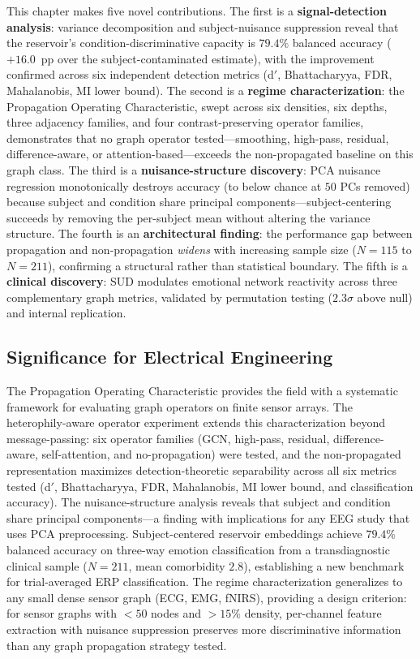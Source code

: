 This chapter makes five novel contributions. The first is a \textbf{signal-detection analysis}: variance decomposition and subject-nuisance suppression reveal that the reservoir's condition-discriminative capacity is $79.4\%$ balanced accuracy ($+16.0$~pp over the subject-contaminated estimate), with the improvement confirmed across six independent detection metrics (d$'$, Bhattacharyya, FDR, Mahalanobis, MI lower bound). The second is a \textbf{regime characterization}: the Propagation Operating Characteristic, swept across six densities, six depths, three adjacency families, and four contrast-preserving operator families, demonstrates that no graph operator tested---smoothing, high-pass, residual, difference-aware, or attention-based---exceeds the non-propagated baseline on this graph class. The third is a \textbf{nuisance-structure discovery}: PCA nuisance regression monotonically destroys accuracy (to below chance at $50$ PCs removed) because subject and condition share principal components---subject-centering succeeds by removing the per-subject mean without altering the variance structure. The fourth is an \textbf{architectural finding}: the performance gap between propagation and non-propagation \emph{widens} with increasing sample size ($N = 115$ to $N = 211$), confirming a structural rather than statistical boundary. The fifth is a \textbf{clinical discovery}: SUD modulates emotional network reactivity across three complementary graph metrics, validated by permutation testing ($2.3\sigma$ above null) and internal replication.

\subsection{Significance for Electrical Engineering}

The Propagation Operating Characteristic provides the field with a systematic framework for evaluating graph operators on finite sensor arrays. The heterophily-aware operator experiment extends this characterization beyond message-passing: six operator families (GCN, high-pass, residual, difference-aware, self-attention, and no-propagation) were tested, and the non-propagated representation maximizes detection-theoretic separability across all six metrics tested (d$'$, Bhattacharyya, FDR, Mahalanobis, MI lower bound, and classification accuracy). The nuisance-structure analysis reveals that subject and condition share principal components---a finding with implications for any EEG study that uses PCA preprocessing. Subject-centered reservoir embeddings achieve $79.4\%$ balanced accuracy on three-way emotion classification from a transdiagnostic clinical sample ($N = 211$, mean comorbidity $2.8$), establishing a new benchmark for trial-averaged ERP classification. The regime characterization generalizes to any small dense sensor graph (ECG, EMG, fNIRS), providing a design criterion: for sensor graphs with $< 50$ nodes and $> 15\%$ density, per-channel feature extraction with nuisance suppression preserves more discriminative information than any graph propagation strategy tested.

